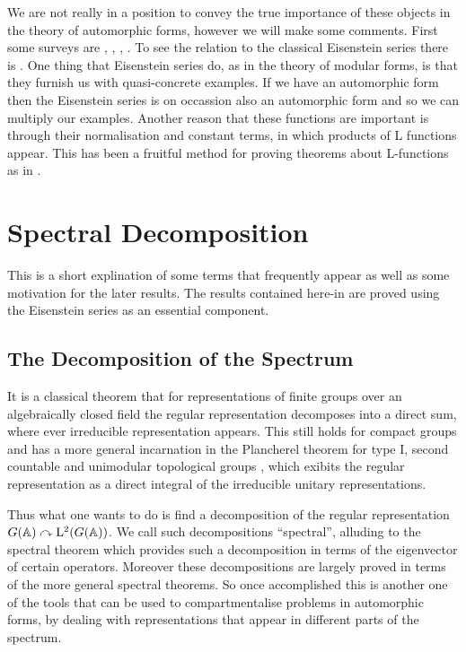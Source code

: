We are not really in a position to convey the true importance of these objects in the theory of automorphic forms, however we will make some comments. First some surveys are \cite{lapidPerspectivesEisensteinSeries2022}, \cite{arthurEisensteinSeriesTrace1979}, \cite{kimEISENSTEINSERIESTHEIR}, \cite{jiangResiduesEisensteinSeries2008a}. To see the relation to the classical Eisenstein series there is \cite{garrettTransitionEisensteinSeries2016}. One thing that Eisenstein series do, as in the theory of modular forms, is that they furnish us with quasi-concrete examples. If we have an automorphic form then the Eisenstein series is on occassion also an automorphic form and so we can multiply our examples. Another reason that these functions are important is through their normalisation and constant terms, in which products of L functions appear. This has been a fruitful method for proving theorems about L-functions as in \cite{shahidiEisensteinSeriesAutomorphic2010}\cite{pollackRANKINSELBERGMETHODUSER}\cite{arthurEisensteinSeriesTrace1979}.

\section{Spectral Decomposition}\label{spectral_decomposition}
This is a short explination of some terms that frequently appear as well as some motivation for the later results. The results contained here-in are proved using the Eisenstein series as an essential component. 

\subsection{The Decomposition of the Spectrum}
It is a classical theorem that for representations of finite groups over an algebraically closed field the regular representation decomposes into a direct sum, where ever irreducible representation appears. This still holds for compact groups \cite[5.1]{follandCourseAbstractHarmonic2016} and has a more general incarnation in the Plancherel theorem for type I, second countable and unimodular topological groups \cite[7.44]{follandCourseAbstractHarmonic2016}, which exibits the regular representation as a direct integral of the irreducible unitary representations. 


Thus what one wants to do is find a decomposition of the regular representation \(G(\A) \curvearrowright \mathrm{L}^2(G(\A))\).
We call such decompositions ``spectral'', alluding to the spectral theorem which provides such a decomposition in terms of the eigenvector of certain operators. Moreover these decompositions are largely proved in terms of the more general spectral theorems. So once accomplished this is another one of the tools that can be used to compartmentalise problems in automorphic forms, by dealing with representations that appear in different parts of the spectrum. 

